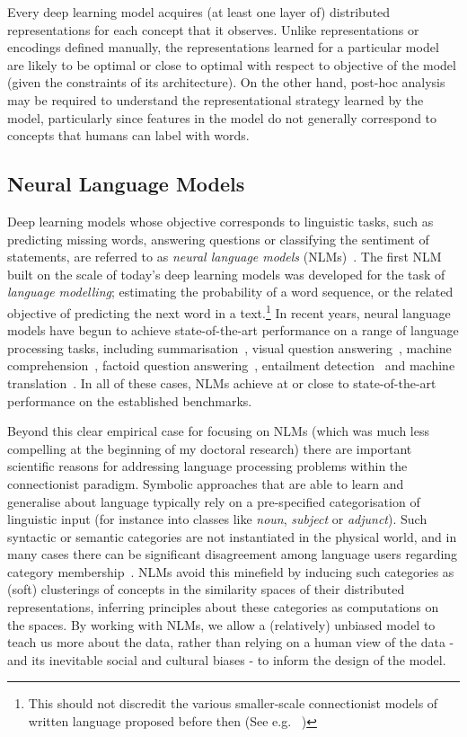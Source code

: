 Every deep learning model acquires (at least one layer of) distributed representations for each concept that it observes. Unlike representations or encodings defined manually, the representations learned for a particular model are likely to be optimal or close to optimal with respect to objective of the model (given the constraints of its architecture). On the other hand, post-hoc analysis may be required to understand the representational strategy learned by the model, particularly since features in the model do not generally correspond to concepts that humans can label with words.        

\subsection{Neural Language Models} Deep learning models whose objective corresponds to linguistic tasks, such as predicting missing words, answering questions or classifying the sentiment of statements, are referred to as \emph{neural language models} (NLMs)~\citep{bengio2003neural}. The first NLM built on the scale of today's deep learning models was developed for the task of \emph{language modelling}; estimating the probability of a word sequence, or the related objective of predicting the next word in a text.\footnote{This should not discredit the various smaller-scale connectionist models of written language proposed before then (See e.g. ~\citealt{elman1990finding,miikkulainen1991natural})} In recent years, neural language models have begun to achieve state-of-the-art performance on a range of language processing tasks, including summarisation~\citep{rush2015neural}, visual question answering~\citep{antol2015vqa}, machine comprehension~\citep{hill2015goldilocks}, factoid question answering~\citep{bordes2014question}, entailment detection~\citep{rocktaschel2015reasoning} and machine translation~\citep{bahdanau2014neural}. In all of these cases, NLMs achieve at or close to state-of-the-art performance on the established benchmarks.  

Beyond this clear empirical case for focusing on NLMs (which was much less compelling at the beginning of my doctoral research) there are important scientific reasons for addressing language processing problems within the connectionist paradigm. Symbolic approaches that are able to learn and generalise about language typically rely on a pre-specified categorisation of linguistic input (for instance into classes like \emph{noun}, \emph{subject} or \emph{adjunct}). Such syntactic or semantic categories are not instantiated in the physical world, and in many cases there can be significant disagreement among language users regarding category membership~\citep{anward1997parts}. NLMs avoid this minefield by inducing such categories as (soft) clusterings of concepts in the similarity spaces of their distributed representations, inferring principles about these categories as computations on the spaces. By working with NLMs, we allow a (relatively) unbiased model to teach us more about the data, rather than relying on a human view of the data - and its inevitable social and cultural biases - to inform the design of the model. 

